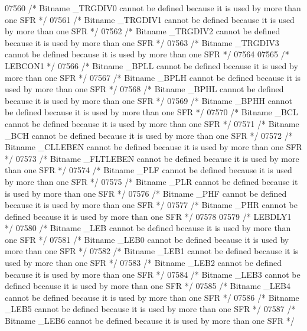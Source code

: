 \begin{DoxyCode}
07560 \textcolor{comment}{/* Bitname \_TRGDIV0 cannot be defined because it is used by more than one SFR */}
07561 \textcolor{comment}{/* Bitname \_TRGDIV1 cannot be defined because it is used by more than one SFR */}
07562 \textcolor{comment}{/* Bitname \_TRGDIV2 cannot be defined because it is used by more than one SFR */}
07563 \textcolor{comment}{/* Bitname \_TRGDIV3 cannot be defined because it is used by more than one SFR */}
07564 
07565 \textcolor{comment}{/* LEBCON1 */}
07566 \textcolor{comment}{/* Bitname \_BPLL cannot be defined because it is used by more than one SFR */}
07567 \textcolor{comment}{/* Bitname \_BPLH cannot be defined because it is used by more than one SFR */}
07568 \textcolor{comment}{/* Bitname \_BPHL cannot be defined because it is used by more than one SFR */}
07569 \textcolor{comment}{/* Bitname \_BPHH cannot be defined because it is used by more than one SFR */}
07570 \textcolor{comment}{/* Bitname \_BCL cannot be defined because it is used by more than one SFR */}
07571 \textcolor{comment}{/* Bitname \_BCH cannot be defined because it is used by more than one SFR */}
07572 \textcolor{comment}{/* Bitname \_CLLEBEN cannot be defined because it is used by more than one SFR */}
07573 \textcolor{comment}{/* Bitname \_FLTLEBEN cannot be defined because it is used by more than one SFR */}
07574 \textcolor{comment}{/* Bitname \_PLF cannot be defined because it is used by more than one SFR */}
07575 \textcolor{comment}{/* Bitname \_PLR cannot be defined because it is used by more than one SFR */}
07576 \textcolor{comment}{/* Bitname \_PHF cannot be defined because it is used by more than one SFR */}
07577 \textcolor{comment}{/* Bitname \_PHR cannot be defined because it is used by more than one SFR */}
07578 
07579 \textcolor{comment}{/* LEBDLY1 */}
07580 \textcolor{comment}{/* Bitname \_LEB cannot be defined because it is used by more than one SFR */}
07581 \textcolor{comment}{/* Bitname \_LEB0 cannot be defined because it is used by more than one SFR */}
07582 \textcolor{comment}{/* Bitname \_LEB1 cannot be defined because it is used by more than one SFR */}
07583 \textcolor{comment}{/* Bitname \_LEB2 cannot be defined because it is used by more than one SFR */}
07584 \textcolor{comment}{/* Bitname \_LEB3 cannot be defined because it is used by more than one SFR */}
07585 \textcolor{comment}{/* Bitname \_LEB4 cannot be defined because it is used by more than one SFR */}
07586 \textcolor{comment}{/* Bitname \_LEB5 cannot be defined because it is used by more than one SFR */}
07587 \textcolor{comment}{/* Bitname \_LEB6 cannot be defined because it is used by more than one SFR */}

\end{DoxyCode}
